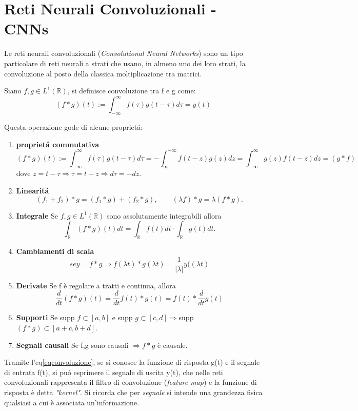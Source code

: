\documentclass[a4paper,12pt,oneside]{book}
\begin{document}
\section{Reti Neurali Convoluzionali - CNNs}
Le reti neurali convoluzionali (\textit{Convolutional Neural Networks}) sono un tipo particolare di reti neurali a strati che usano, in almeno uno dei loro strati, la convoluzione al posto della classica moltiplicazione tra matrici.
\begin{defin}
Siano $f,g\in L^1(\mathbb{R})$, si definisce convoluzione tra f e g come:
\begin{equation}\label{eqconvoluzione}
(f*g)(t):= \int_{-\infty}^{\infty} f(\tau)g(t-\tau)d\tau=y(t)
\end{equation}
\end{defin}
Questa operazione gode di alcune propriet\'{a}:
\begin{enumerate}
\item \textbf{propriet\'{a} commutativa}$$
(f*g)(t):= \int_{-\infty}^{\infty} f(\tau)g(t-\tau)d\tau=-\int_{\infty}^{-\infty} f(t-z)g(z)dz=\int_{-\infty}^{\infty}g(z)f(t-z)dz=(g*f)$$
dove $z=t-\tau \Rightarrow \tau=t-z \Rightarrow d\tau=-dz$.
\item \textbf{Linearit\'{a}}$$ (f_1+f_2)*g=(f_1*g)+(f_2*g), \qquad (\lambda f)*g=\lambda(f*g).$$ 
\item \textbf{Integrale} Se $f,g\in L^1(\mathbb{R})$ sono assolutamente integrabili allora $$\int_{\mathbb{R}}(f*g)(t)dt=\int_{\mathbb{R}}f(t)dt \cdotp \int_{\mathbb{R}}g(t)dt.$$
\item \textbf{Cambiamenti di scala} $$se y=f*g\Rightarrow f(\lambda t)*g(\lambda t)=\frac{1}{|\lambda|}y((\lambda t)$$
\item \textbf{Derivate} Se f  \`e regolare a tratti e continua, allora 
$$ \frac{d}{dt}(f*g)(t)=\frac{d}{dt}f(t)*g(t)=f(t)*\frac{d}{dt}g(t)$$
\item \textbf{Supporti} Se supp $f\subset [a,b]$ e supp $g\subset [c,d]\Rightarrow $supp $(f*g)\subset [a+c,b+d].$
\item \textbf{Segnali causali} Se f,g sono causali $\Rightarrow f*g$ \`e causale.
\end{enumerate}
Tramite l'eq\ref{eqconvoluzione}, se si conosce la funzione di risposta g(t) e il segnale di entrata f(t), si pu\'{o} esprimere il segnale di uscita y(t), che nelle reti convoluzionali rappresenta il filtro di convoluzione (\textit{feature map}) e la funzione di risposta \`e detta \textit{"kernel"}.
Si ricorda che per \textit{segnale} si intende una grandezza fisica qualsiasi a cui \`e associata un'informazione.\\
\end{document}

